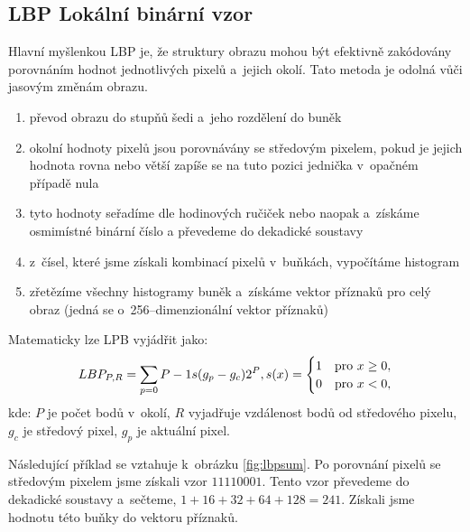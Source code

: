 \subsection{LBP Lokální binární vzor}
Hlavní myšlenkou LBP je, že struktury obrazu mohou být efektivně zakódovány porovnáním hodnot jednotlivých pixelů a~jejich okolí. Tato metoda je odolná vůči jasovým změnám obrazu.
\begin{enumerate}
  \item převod obrazu do stupňů šedi a~jeho rozdělení do buněk
  \item okolní hodnoty pixelů jsou porovnávány se středovým pixelem, pokud je jejich hodnota rovna nebo větší zapíše se na tuto pozici jednička v~opačném případě nula
  \item tyto hodnoty seřadíme dle hodinových ručiček nebo naopak a~získáme osmimístné binární číslo a převedeme do dekadické soustavy
  \item z~čísel, které jsme získali kombinací pixelů v~buňkách, vypočítáme histogram
  \item zřetězíme všechny histogramy buněk a~získáme vektor příznaků pro celý obraz (jedná se o~256--dimenzionální vektor příznaků)
\end{enumerate}
Matematicky lze LPB vyjádřit jako:
\begin{equation*}
LBP_{P,R} = \sum_{p=0}{P-1} s(g_p - g_c)2^P, \\
s(x) =
  \begin{cases} 
   1 & \text{pro } x \geq 0, \\
   0       & \text{pro } x < 0,
  \end{cases}
\end{equation*}
kde: $P$ je počet bodů v~okolí, $R$ vyjadřuje vzdálenost bodů od středového pixelu, $g_c$ je středový pixel, $g_p$ je aktuální pixel. 

Následující příklad se vztahuje k~obrázku \ref{fig:lbpsum}. Po porovnání pixelů se středovým pixelem jsme získali vzor $11110001$. Tento vzor převedeme do dekadické soustavy a~sečteme, $ 1+16+32+64+128 = 241$. Získali jsme hodnotu této buňky do vektoru příznaků.

